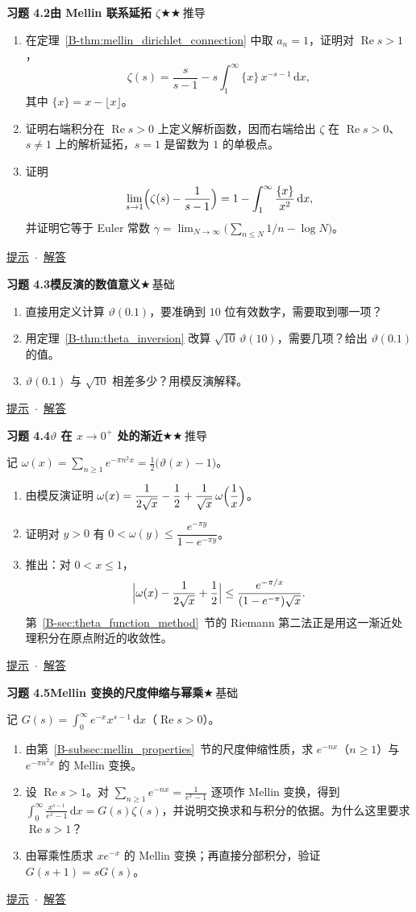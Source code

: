 \documentclass[11pt,a4paper]{article}
\newcommand{\dd}{\,\mathrm{d}}
\renewcommand{\Re}{\operatorname{Re}}
\newcommand{\bref}[1]{\ref*{B-#1}}
\newcommand{\lvI}{$\bigstar$\,基础}
\newcommand{\lvII}{$\bigstar\bigstar$\,推导}
\newcommand{\Q}[3]{%
  \par\addvspace{1.1em}\noindent
  \hypertarget{q:#1}{}\textbf{习题 #1}\quad\textbf{#3}\hfill{\small #2}\par
  \nopagebreak\smallskip}
\newcommand{\toHint}[1]{\hfill{\small\hyperlink{h:#1}{提示}\ $\cdot$\ \hyperlink{s:#1}{解答}}}
\begin{document}
\Q{4.2}{\lvII}{由 Mellin 联系延拓 $\zeta$}
\begin{enumerate}
  \item 在定理~\bref{thm:mellin_dirichlet_connection} 中取 $a_n=1$，证明对 $\Re s>1$，
  \[
    \zeta(s)=\frac{s}{s-1}-s\int_1^\infty\{x\}\,x^{-s-1}\dd x ,
  \]
  其中 $\{x\}=x-\lfloor x\rfloor$。
  \item 证明右端积分在 $\Re s>0$ 上定义解析函数，因而右端给出 $\zeta$ 在 $\Re s>0$、$s\ne1$ 上的解析延拓，$s=1$ 是留数为 $1$ 的单极点。
  \item 证明
  \[
    \lim_{s\to1}\Bigl(\zeta(s)-\frac1{s-1}\Bigr)=1-\int_1^\infty\frac{\{x\}}{x^2}\dd x ,
  \]
  并证明它等于 Euler 常数 $\gamma=\lim_{N\to\infty}\bigl(\sum_{n\le N}1/n-\log N\bigr)$。
\end{enumerate}
\toHint{4.2}

\Q{4.3}{\lvI}{模反演的数值意义}
\begin{enumerate}
  \item 直接用定义计算 $\vartheta(0.1)$，要准确到 $10$ 位有效数字，需要取到哪一项？
  \item 用定理~\bref{thm:theta_inversion} 改算 $\sqrt{10}\,\vartheta(10)$，需要几项？给出 $\vartheta(0.1)$ 的值。
  \item $\vartheta(0.1)$ 与 $\sqrt{10}$ 相差多少？用模反演解释。
\end{enumerate}
\toHint{4.3}

\Q{4.4}{\lvII}{$\vartheta$ 在 $x\to0^+$ 处的渐近}
记 $\omega(x)=\sum_{n\ge1}e^{-\pi n^2x}=\tfrac12\bigl(\vartheta(x)-1\bigr)$。
\begin{enumerate}
  \item 由模反演证明 $\omega(x)=\dfrac1{2\sqrt x}-\dfrac12+\dfrac1{\sqrt x}\,\omega\Bigl(\dfrac1x\Bigr)$。
  \item 证明对 $y>0$ 有 $0<\omega(y)\le\dfrac{e^{-\pi y}}{1-e^{-\pi y}}$。
  \item 推出：对 $0<x\le1$，
  \[
    \Bigl|\omega(x)-\frac1{2\sqrt x}+\frac12\Bigr|\le\frac{e^{-\pi/x}}{(1-e^{-\pi})\sqrt x}.
  \]
  第~\bref{sec:theta_function_method}~节的 Riemann 第二法正是用这一渐近处理积分在原点附近的收敛性。
\end{enumerate}
\toHint{4.4}

\Q{4.5}{\lvI}{Mellin 变换的尺度伸缩与幂乘}
记 $G(s)=\int_0^\infty e^{-x}x^{s-1}\dd x$（$\Re s>0$）。
\begin{enumerate}
  \item 由第~\bref{subsec:mellin_properties}~节的尺度伸缩性质，求 $e^{-nx}$（$n\ge1$）与 $e^{-\pi n^2x}$ 的 Mellin 变换。
  \item 设 $\Re s>1$。对 $\sum_{n\ge1}e^{-nx}=\frac1{e^x-1}$ 逐项作 Mellin 变换，得到 $\int_0^\infty\frac{x^{s-1}}{e^x-1}\dd x=G(s)\zeta(s)$，并说明交换求和与积分的依据。为什么这里要求 $\Re s>1$？
  \item 由幂乘性质求 $xe^{-x}$ 的 Mellin 变换；再直接分部积分，验证 $G(s+1)=sG(s)$。
\end{enumerate}
\toHint{4.5}
\end{document}
